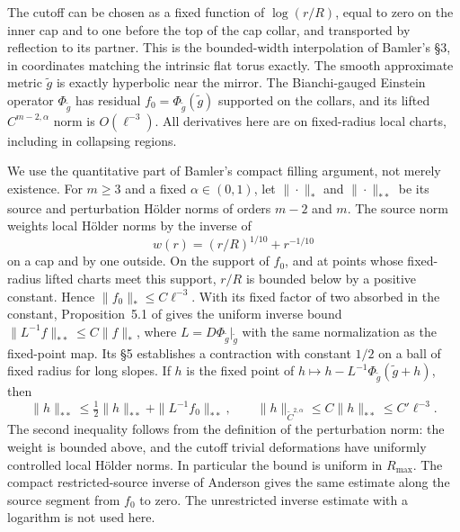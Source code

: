 \documentclass[11pt]{article}
\theoremstyle{remark}
\begin{document}
The cutoff can be chosen as a fixed function of \(\log(r/R)\), equal to zero on the inner cap and to one before the top of the cap collar, and transported by reflection to its partner. This is the bounded-width interpolation of Bamler's \S3, in coordinates matching the intrinsic flat torus exactly. The smooth approximate metric \(\widetilde g\) is exactly hyperbolic near the mirror. The Bianchi-gauged Einstein operator \(\Phi_{\widetilde g}\) has residual
\(f_0=\Phi_{\widetilde g}(\widetilde g)\) supported on the collars, and its lifted \(C^{m-2,\alpha}\) norm is \(O(\ell^{-3})\). All derivatives here are on fixed-radius local charts, including in collapsing regions.

We use the quantitative part of Bamler's compact filling argument, not merely existence. For \(m\ge 3\) and a fixed \(\alpha\in(0,1)\), let \(\|\cdot\|_*\) and \(\|\cdot\|_{**}\) be its source and perturbation Hölder norms of orders \(m-2\) and \(m\). The source norm weights local Hölder norms by the inverse of
\[
 w(r)=(r/R)^{1/10}+r^{-1/10}
\]
on a cap and by one outside. On the support of \(f_0\), and at points whose fixed-radius lifted charts meet this support, \(r/R\) is bounded below by a positive constant. Hence \(\|f_0\|_*\le C\ell^{-3}\). With its fixed factor of two absorbed in the constant, Proposition~5.1 of \cite{bamler} gives the uniform inverse bound \(\|L^{-1}f\|_{**}\le C\|f\|_*\), where \(L=D\Phi_{\widetilde g}|_{\widetilde g}\) with the same normalization as the fixed-point map. Its \S5 establishes a contraction with constant \(1/2\) on a ball of fixed radius for long slopes. If \(h\) is the fixed point of \(h\mapsto h-L^{-1}\Phi_{\widetilde g}(\widetilde g+h)\), then
\[
 \|h\|_{**}\le
 \tfrac12\|h\|_{**}+\|L^{-1}f_0\|_{**},
 \qquad
 \|h\|_{\widetilde C^{2,\alpha}}\le C\|h\|_{**}\le C'\ell^{-3}.
\]
The second inequality follows from the definition of the perturbation norm: the weight is bounded above, and the cutoff trivial deformations have uniformly controlled local Hölder norms. In particular the bound is uniform in \(R_{\max}\). The compact restricted-source inverse of Anderson \cite[Proposition~3.7 and (3.37)--(3.44)]{anderson} gives the same estimate along the source segment from \(f_0\) to zero. The unrestricted inverse estimate with a logarithm is not used here.
\end{document}
